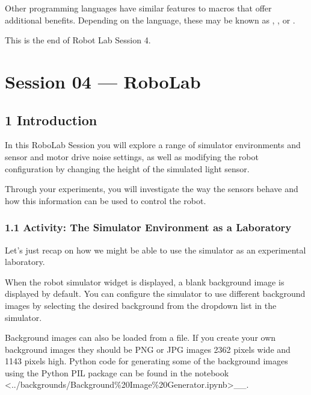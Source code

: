 \documentclass[letterpaper,10pt,english]{sphinxmanual}
\begin{document}
{Other programming languages have similar features to macros that offer additional benefits. Depending on the language, these may be known as , ,  or .

This is the end of Robot Lab Session 4.


\section{Session 04 — RoboLab}
\label{\detokenize{index:session-04-robolab}}

\subsection{1 Introduction}
\label{\detokenize{content/04_Robot_Lab/Section_00_01:1-Introduction}}\label{\detokenize{content/04_Robot_Lab/Section_00_01::doc}}
In this RoboLab Session you will explore a range of simulator environments and sensor and motor drive noise settings, as well as modifying the robot configuration by changing the height of the simulated light sensor.

Through your experiments, you will investigate the way the sensors behave and how this information can be used to control the robot.


\subsubsection{1.1 Activity: The Simulator Environment as a Laboratory}
\label{\detokenize{content/04_Robot_Lab/Section_00_01:1.1-Activity:-The-Simulator-Environment-as-a-Laboratory}}
Let’s just recap on how we might be able to use the simulator as an experimental laboratory.

When the robot simulator widget is displayed, a blank background image is displayed by default. You can configure the simulator to use different background images by selecting the desired background from the dropdown list in the simulator.

Background images can also be loaded from a file. If you create your own background images they should be PNG or JPG images 2362 pixels wide and 1143 pixels high. Python code for generating some of the background images using the Python PIL package can be found in the notebook  \textless{}../backgrounds/Background\%20Image\%20Generator.ipynb\textgreater{}\textasciigrave{}\_\_.

}
\end{document}
